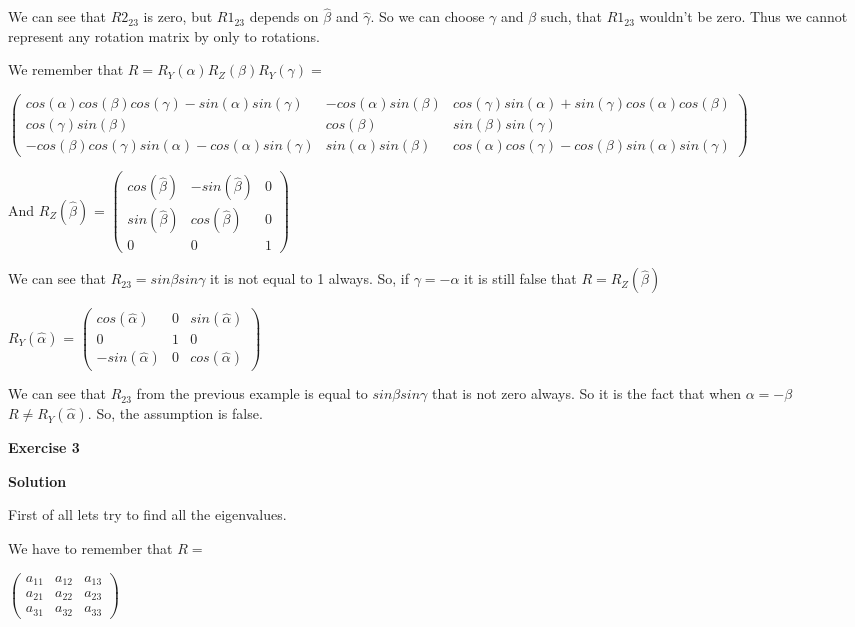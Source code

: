 \documentclass[12pt]{article}
\begin{document}
\begin{list}{()~}{}
We can see that $R2_{23}$ is zero, but $R1_{23}$ depends on $\hat{\beta}$ and $\hat{\gamma}$. So we can choose $\gamma$ and $\beta$ such, that $R1_{23}$ wouldn't be zero. Thus we cannot represent any rotation matrix by only to rotations.
\item
We remember that $R = R_Y(\alpha)R_Z(\beta)R_Y(\gamma) =$

$\left( \begin{array}{ccc}
cos(\alpha) cos(\beta) cos(\gamma) - sin(\alpha) sin(\gamma) & - cos(\alpha) sin(\beta) & cos(\gamma) sin(\alpha) + sin(\gamma) cos(\alpha) cos(\beta) \\
cos(\gamma) sin(\beta) & cos(\beta) & sin(\beta) sin(\gamma) \\
- cos(\beta) cos(\gamma) sin(\alpha) - cos(\alpha) sin(\gamma) & sin(\alpha) sin(\beta) & cos(\alpha) cos(\gamma) - cos(\beta) sin(\alpha) sin(\gamma) \end{array} \right)$

And $R_Z(\hat{\beta})$ = $\left( \begin{array}{ccc}
cos(\hat{\beta}) & - sin(\hat{\beta}) & 0 \\
sin(\hat{\beta}) & cos(\hat{\beta}) & 0 \\
0 & 0 & 1 \end{array} \right)$

We can see that $R_{23} = sin \beta sin \gamma$ it is not equal to 1 always.
So, if $\gamma = - \alpha$ it is still false that $R = R_Z(\hat{\beta})$
\item
$R_Y(\hat{\alpha})$ = $\left( \begin{array}{ccc}
cos(\hat{\alpha}) & 0 & sin(\hat{\alpha})\\
0 & 1 & 0 \\
- sin(\hat{\alpha}) & 0 & cos(\hat{\alpha}) \end{array} \right)$

We can see that $R_{23}$ from the previous example is equal to $sin \beta sin \gamma$ that is not zero always. So it is the fact that when $\alpha = - \beta$ $R \neq R_Y(\hat{\alpha})$. So, the assumption is false.
\end{list}

\textbf{Exercise 3}		
		
\textbf{Solution}

\medskip

First of all lets try to find all the eigenvalues.

We have to remember that $R = $

$\left( \begin{array}{ccc}
a_{11} & a_{12} & a_{13}  \\
a_{21} & a_{22} & a_{23} \\
a_{31} & a_{32} & a_{33} \end{array} \right)$
\end{document}
